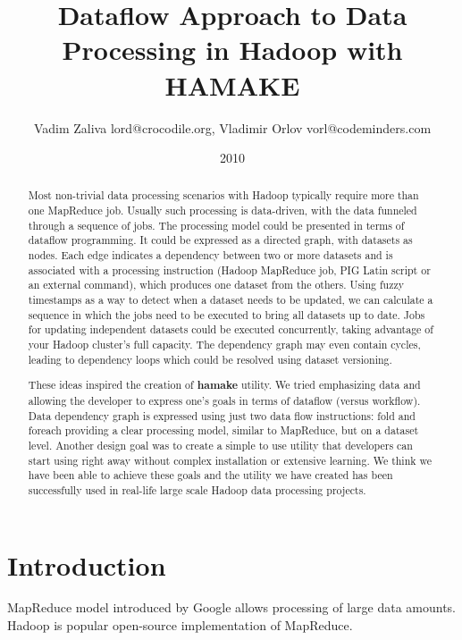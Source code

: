 \documentclass{article}
\author{Vadim Zaliva lord@crocodile.org, Vladimir Orlov vorl@codeminders.com}
\date{2010}
\title{Dataflow Approach to Data Processing in Hadoop with HAMAKE}
\begin{document}
\lstset{language=XML,basicstyle=\tiny,markfirstintag=true,numbers=left, numberstyle=\tiny}

\maketitle

\begin{abstract}
  Most non-trivial data processing scenarios with Hadoop typically
  require more than one MapReduce job. Usually such processing is
  data-driven, with the data funneled through a sequence of jobs. The
  processing model could be presented in terms of dataflow
  programming. It could be expressed as a directed graph, with
  datasets as nodes. Each edge indicates a dependency between two or
  more datasets and is associated with a processing instruction
  (Hadoop MapReduce job, PIG Latin script or an external command),
  which produces one dataset from the others. Using fuzzy timestamps
  as a way to detect when a dataset needs to be updated, we can
  calculate a sequence in which the jobs need to be executed to bring
  all datasets up to date. Jobs for updating independent datasets
  could be executed concurrently, taking advantage of your Hadoop
  cluster's full capacity. The dependency graph may even contain
  cycles, leading to dependency loops which could be resolved using
  dataset versioning.

  These ideas inspired the creation of \textbf{hamake} utility. We tried
  emphasizing data and allowing the developer to express one's goals
  in terms of dataflow (versus workflow). Data dependency graph is
  expressed using just two data flow instructions: fold and foreach
  providing a clear processing model, similar to MapReduce, but on a
  dataset level. Another design goal was to create a simple to use
  utility that developers can start using right away without complex
  installation or extensive learning. We think we have been able to
  achieve these goals and the utility we have created has been
  successfully used in real-life large scale Hadoop data processing
  projects. 
\end{abstract}

\section{Introduction}

MapReduce model introduced by Google\cite{dean2008map} allows
processing of large data amounts. Hadoop\cite{bialecki2005hadoop} is
popular open-source implementation of MapReduce.
\end{document}
